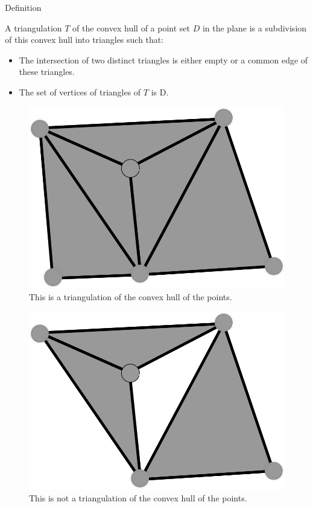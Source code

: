 \documentclass[18pt]{beamer}
\begin{document}
\begin{frame}{Definition}

 A triangulation $T$ of the convex hull of a point set $D$ in the plane is a subdivision of this convex hull into triangles such
that:
\begin{itemize}
 \item<2-> The intersection of two distinct triangles is either empty or a common edge of these triangles.
 \item<3-> The set of vertices of triangles of $T$ is D.
\end{itemize}

\begin{overprint}
\begin{figure}
  \centering
  \includegraphics[scale=1.5]{Trig1}
  \caption{\label{Trig1} This is a triangulation of the convex hull of the points.}
\end{figure}

\begin{figure}
  \centering
  \includegraphics[scale=1.5]{NotTrig1}
  \caption{\label{NotTrig1} This is not a triangulation of the convex hull of the points.}
\end{figure}


\end{overprint}
\end{frame}
\end{document}
